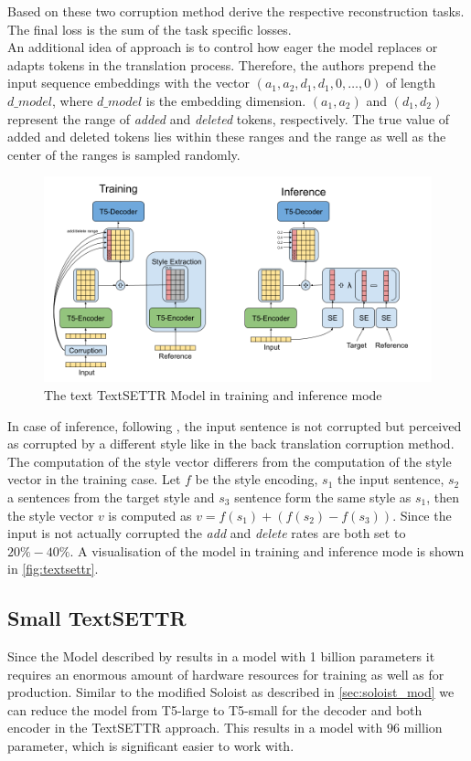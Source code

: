 \documentclass[twocolumn]{tum-article}
\begin{document}
Based on these two corruption method \cite{riley2020textsettr} derive the respective reconstruction tasks. The final loss is the sum of the task specific losses.\\
An additional idea of \cite{riley2020textsettr} approach is to control how eager the model replaces or adapts tokens in the translation process. Therefore, the authors prepend the input sequence embeddings with the vector $(a_1, a_2, d_1, d_1, 0, \dots, 0)$ of length $d\_model$, where $d\_model$ is the embedding dimension. $(a_1, a_2)$ and $(d_1, d_2)$ represent the range of \textit{added} and \textit{deleted} tokens, respectively. The true value of added and deleted tokens lies within these ranges and the range as well as the center of the ranges is sampled randomly.\\
\begin{figure}[!h]
\centering
\includegraphics[width=\textwidth]{figures/TextSETTR.png}
\caption{The text TextSETTR Model \cite{riley2020textsettr} in training and inference mode}
\label{fig:textsettr}
\end{figure}
In case of inference, following \cite{riley2020textsettr}, the input sentence is not corrupted but perceived as corrupted by a different style like in the back translation corruption method. The computation of the style vector differers from the computation of the style vector in the training case. Let $f$ be the style encoding, $s_1$ the input sentence, $s_2$ a sentences from the target style and $s_3$ sentence form the same style as $s_1$, then the style vector $v$ is computed as $v = f(s_1) + (f(s_2) - f(s_3))$. Since the input is not actually corrupted the \textit{add} and \textit{delete} rates are both set to $20\%-40\%$. A visualisation of the model in training and inference mode is shown in \autoref{fig:textsettr}.
\subsection{Small TextSETTR}\label{sec:textsettr_small}
Since the Model described by \cite{riley2020textsettr} results in a model with 1 billion parameters it requires an enormous amount of hardware resources for training as well as for production. Similar to the modified Soloist as described in \autoref{sec:soloist_mod} we can reduce the model from T5-large to T5-small for the decoder and both encoder in the TextSETTR approach. This results in a model with $96$ million parameter, which is significant easier to work with. 
\end{document}

